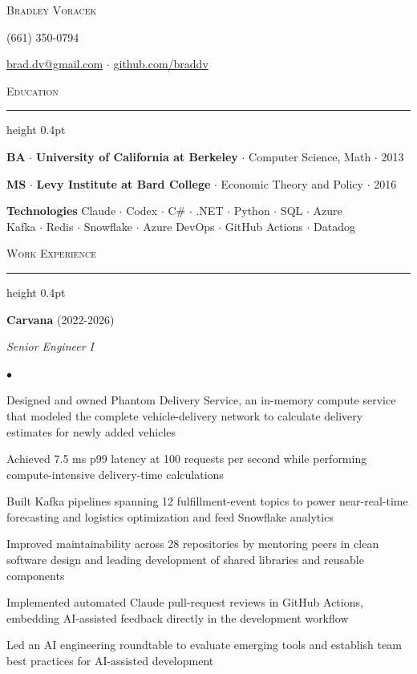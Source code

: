 \documentclass[12pt,letterpaper]{article}
\newcommand{\resumesection}[1]{%
  \vspace{0.55em}%
  {\scshape #1}\par
  \vspace{0.12em}\hrule height 0.4pt
  \vspace{0.36em}%
}
\newcommand{\entry}[3]{%
  \hspace*{0.20in}\textbf{#1} #2\par
  \if\relax\detokenize{#3}\relax\else
    \hspace*{0.20in}\textit{#3}\par
  \fi
}
\newenvironment{resumelist}{%
  \begin{list}{$\bullet$}{%
    \setlength{\leftmargin}{0.70in}%
    \setlength{\labelwidth}{0.15in}%
    \setlength{\labelsep}{0.08in}%
    \setlength{\itemsep}{0pt}%
    \setlength{\parsep}{0pt}%
    \setlength{\topsep}{0.12em}%
    \setlength{\partopsep}{0pt}%
  }%
}{\end{list}}
\begin{document}
{\centering\hspace*{0.10in}%
  {\Large\scshape Bradley Voracek}\par
  \vspace{0.06em}
  (661) 350-0794\par
  \href{mailto:brad.dv@gmail.com}{brad.dv@gmail.com} $\cdot$
  \href{https://github.com/braddv}{github.com/braddv}\par
}
\vspace{0.10em}

\resumesection{Education}

\hspace*{0.20in}\textbf{BA} $\cdot$ \textbf{University of California at Berkeley}
$\cdot$ Computer Science, Math $\cdot$ 2013\par
\hspace*{0.20in}\textbf{MS} $\cdot$ \textbf{Levy Institute at Bard College}
$\cdot$ Economic Theory and Policy $\cdot$ 2016\par

\vspace{0.30em}
\noindent\hfill
\begin{minipage}{0.90\textwidth}
  \textbf{Technologies} Claude $\cdot$ Codex $\cdot$ C\# $\cdot$ .NET $\cdot$ Python
  $\cdot$ SQL $\cdot$ Azure\\
  Kafka $\cdot$ Redis $\cdot$ Snowflake $\cdot$ Azure DevOps $\cdot$ GitHub Actions
  $\cdot$ Datadog
\end{minipage}
\hfill\mbox{}\par
\vspace{0.10em}

\resumesection{Work Experience}

\entry{Carvana}{(2022-2026)}{Senior Engineer I}
\begin{resumelist}
  \item Designed and owned Phantom Delivery Service, an in-memory compute service that
        modeled the complete vehicle-delivery network to calculate delivery estimates for
        newly added vehicles
  \item Achieved 7.5 ms p99 latency at 100 requests per second while performing
        compute-intensive delivery-time calculations
  \item Built Kafka pipelines spanning 12 fulfillment-event topics to power near-real-time
        forecasting and logistics optimization and feed Snowflake analytics
  \item Improved maintainability across 28 repositories by mentoring peers in clean software
        design and leading development of shared libraries and reusable components
  \item Implemented automated Claude pull-request reviews in GitHub Actions, embedding
        AI-assisted feedback directly in the development workflow
  \item Led an AI engineering roundtable to evaluate emerging tools and establish team best
        practices for AI-assisted development
\end{resumelist}
\end{document}
